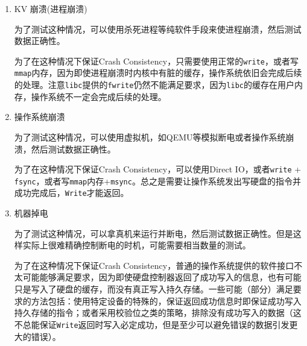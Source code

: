 \documentclass[12pt, UTF8]{article}
\begin{document}
\begin{enumerate}
  \item KV 崩溃(进程崩溃)
  
  为了测试这种情况，可以使用杀死进程等纯软件手段来使进程崩溃，然后测试数据正确性。
  
  为了在这种情况下保证Crash Consistency，只需要使用正常的\lstinline|write|，或者写\lstinline|mmap|内存，因为即使进程崩溃时内核中有脏的缓存，操作系统依旧会完成后续的处理。注意\lstinline|libc|提供的\lstinline|fwrite|仍然不能满足要求，因为\lstinline|libc|的缓存在用户内存，操作系统不一定会完成后续的处理。
  \item 操作系统崩溃
  
  为了测试这种情况，可以使用虚拟机，如QEMU等模拟断电或者操作系统崩溃，然后测试数据正确性。
  
  为了在这种情况下保证Crash Consistency，可以使用Direct IO，或者\lstinline|write| + \lstinline|fsync|，或者写\lstinline|mmap|内存+\lstinline|msync|。总之是需要让操作系统发出写硬盘的指令并成功完成后，\lstinline|Write|才能返回。
  \item 机器掉电
  
  为了测试这种情况，可以拿真机来运行并断电，然后测试数据正确性。但是这样实际上很难精确控制断电的时机，可能需要相当数量的测试。
  
  为了在这种情况下保证Crash Consistency，普通的操作系统提供的软件接口不太可能能够满足要求，因为即使硬盘控制器返回了成功写入的信息，也有可能只是写入了硬盘的缓存，而没有真正写入持久存储。一些可能（部分）满足要求的方法包括：使用特定设备的特殊的，保证返回成功信息时即保证成功写入持久存储的指令；或者采用校验位之类的策略，排除没有成功写入的数据（这不总能保证\lstinline|Write|返回时写入必定成功，但是至少可以避免错误的数据引发更大的错误）。
\end{enumerate}
\end{document}
